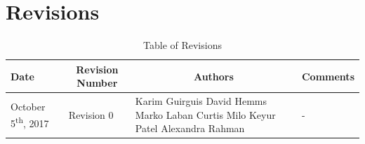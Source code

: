 \documentclass [10pt]{article}
\begin{document}

\pagebreak


\tableofcontents
\listoftables

\pagebreak


\section{Revisions}
\begin{longtable}{| p{ } | p{ } | p{ } | p{ } |}\caption{Table of Revisions}  \\

\hline 
\centering \textbf{Date} & 
\multicolumn{1}{c}{\textbf {Revision Number}} &
\multicolumn{1}{|c}{\textbf {Authors}} & 
\multicolumn{1}{|c|}{\textbf {Comments}} \\ \hline

\multirow{4}{*}{\centering October 5\textsuperscript{th}, 2017}  & 
\multirow{4}{*}{Revision 0}& 
		{Karim Guirguis \newline
		David Hemms \newline
		Marko Laban \newline
		Curtis Milo \newline
		Keyur Patel \newline
		Alexandra Rahman} &
 \multirow{4}{*}{-} \\ 
\hline 



\end{longtable}
\end{document}
